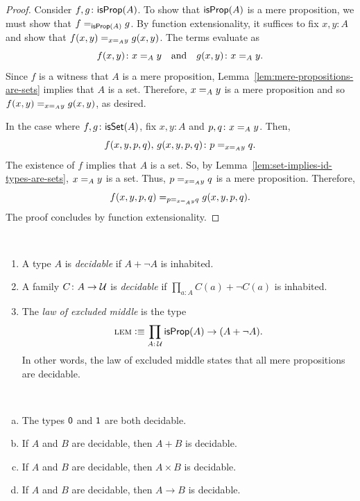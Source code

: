 \begin{proof}
    Consider $f,g\colon\fun{isProp}(A)$. To show that $\mathsf{isProp}(A)$ is a mere proposition, we must show that $f\mathrel{=_{\mathsf{isProp}(A)}}g$. By function extensionality, it suffices to fix $x,y\colon A$ and show that $f(x,y)\mathrel{=_{x\mathrel{=_{A}}y}}g(x,y)$. The terms evaluate as
    \[
        f(x,y)\colon x\eq{A}y
        \quad\text{and}\quad
        g(x,y)\colon x\eq{A}y.
    \]
    Since $f$ is a witness that $A$ is a mere proposition, Lemma~\ref{lem:mere-propositions-are-sets} implies that $A$ is a set. Therefore, $x\mathrel{=_{A}}y$ is a mere proposition and so $f(x,y)\mathrel{=_{x\mathrel{=_{A}}y}}g(x,y)$, as desired.

    In the case where $f,g\colon\fun{isSet}(A)$, fix $x,y\colon A$ and $p,q\colon x\eq{A}y$. Then,
    \[
        f(x,y,p,q),\,g(x,y,p,q)\colon p\eq{x\eq{A}y}q.
    \]
    The existence of $f$ implies that $A$ is a set. So, by Lemma~\ref{lem:set-implies-id-types-are-sets}, $x\mathrel{=_{A}}y$ is a set. Thus, $p\mathrel{=_{x\mathrel{=_{A}}y}}q$ is a mere proposition. Therefore,
    \[
        f(x,y,p,q)\mathrel{=_{p\mathrel{=_{x\mathrel{=_{A}}y}}q}}g(x,y,p,q).
    \]
    The proof concludes by function extensionality.
\end{proof}


\begin{defns}\label{defn:lem}${}$
    \begin{enumerate}[-]
        \item A type $A$ is \textsl{decidable} if $A+\neg A$ is inhabited.
        
        \item A family $C\colon A\to\univ$ is \textsl{decidable} if $\prod_{a\colon A}C(a)+\neg C(a)$ is inhabited.
        
        \item The \textsl{law of excluded middle} is the type
        \[
            \Lem\defeq\prod_{A\colon\univ}\fun{isProp}(A)\to(A+\neg A).
        \]
        In other words, the law of excluded middle states that all mere propositions are decidable.
    \end{enumerate}
\end{defns}


\begin{prop}\label{prop:decidability-of-types}${}$
    \begin{enumerate}[a), font=\upshape]
    \item The types\/ $\mathsf{0}$ and\/ $\mathsf{1}$ are both decidable.
    
    \item If\/ $A$ and\/ $B$ are decidable, then\/ $A+B$ is decidable.
    
    \item If\/ $A$ and\/ $B$ are decidable, then\/ $A\times B$ is decidable.
    
    \item If\/ $A$ and\/ $B$ are decidable, then\/ $A\to B$ is decidable.
    \end{enumerate} 
\end{prop}

